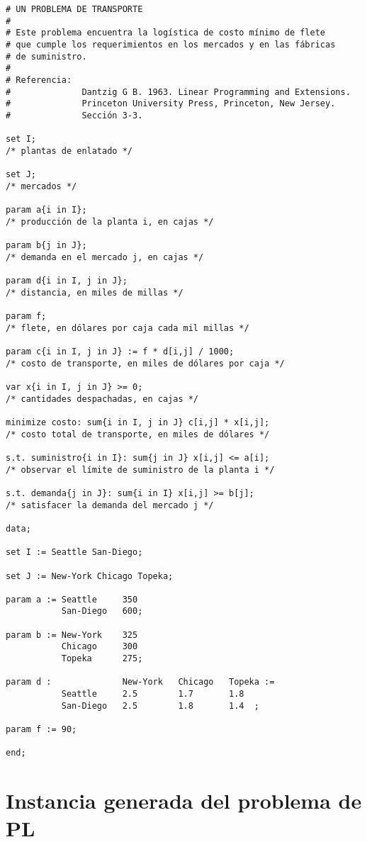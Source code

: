 \documentclass[11pt,spanish]{report}
\begin{document}
\begin{verbatim}
# UN PROBLEMA DE TRANSPORTE
#
# Este problema encuentra la logística de costo mínimo de flete
# que cumple los requerimientos en los mercados y en las fábricas
# de suministro.
#
# Referencia:
#              Dantzig G B. 1963. Linear Programming and Extensions.
#              Princeton University Press, Princeton, New Jersey.
#              Sección 3-3.

set I;
/* plantas de enlatado */

set J;
/* mercados */

param a{i in I};
/* producción de la planta i, en cajas */

param b{j in J};
/* demanda en el mercado j, en cajas */

param d{i in I, j in J};
/* distancia, en miles de millas */

param f;
/* flete, en dólares por caja cada mil millas */

param c{i in I, j in J} := f * d[i,j] / 1000;
/* costo de transporte, en miles de dólares por caja */

var x{i in I, j in J} >= 0;
/* cantidades despachadas, en cajas */

minimize costo: sum{i in I, j in J} c[i,j] * x[i,j];
/* costo total de transporte, en miles de dólares */

s.t. suministro{i in I}: sum{j in J} x[i,j] <= a[i];
/* observar el límite de suministro de la planta i */

s.t. demanda{j in J}: sum{i in I} x[i,j] >= b[j];
/* satisfacer la demanda del mercado j */

data;

set I := Seattle San-Diego;

set J := New-York Chicago Topeka;

param a := Seattle     350
           San-Diego   600;

param b := New-York    325
           Chicago     300
           Topeka      275;

param d :              New-York   Chicago   Topeka :=
           Seattle     2.5        1.7       1.8
           San-Diego   2.5        1.8       1.4  ;

param f := 90;

end;
\end{verbatim}


\section{Instancia generada del problema de PL}
\end{document}
